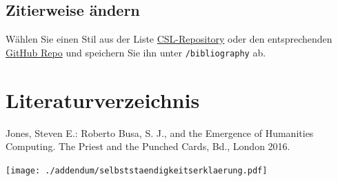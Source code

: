 \documentclass[
  12pt,
  nswissgerman,
  twoside,
  openright]{report}
\newenvironment{cslreferences}%
  {}%
  {\par}
\begin{document}
\hypertarget{zitierweise-uxe4ndern}{%
\section{Zitierweise ändern}\label{zitierweise-uxe4ndern}}

Wählen Sie einen Stil aus der Liste
\href{https://www.zotero.org/styles}{CSL-Repository} oder den
entsprechenden
\href{https://github.com/citation-style-language/styles}{GitHub Repo}
und speichern Sie ihn unter \texttt{/bibliography} ab.

\hypertarget{literaturverzeichnis}{%
\chapter*{Literaturverzeichnis}\label{literaturverzeichnis}}

\hypertarget{refs}{}
\begin{cslreferences}
\leavevmode\hypertarget{ref-jones2016}{}%
Jones, Steven E.: Roberto Busa, S. J., and the Emergence of Humanities
Computing. The Priest and the Punched Cards, Bd., London 2016.
\end{cslreferences}


\texttt{[image: ./addendum/selbststaendigkeitserklaerung.pdf]}
\end{document}
